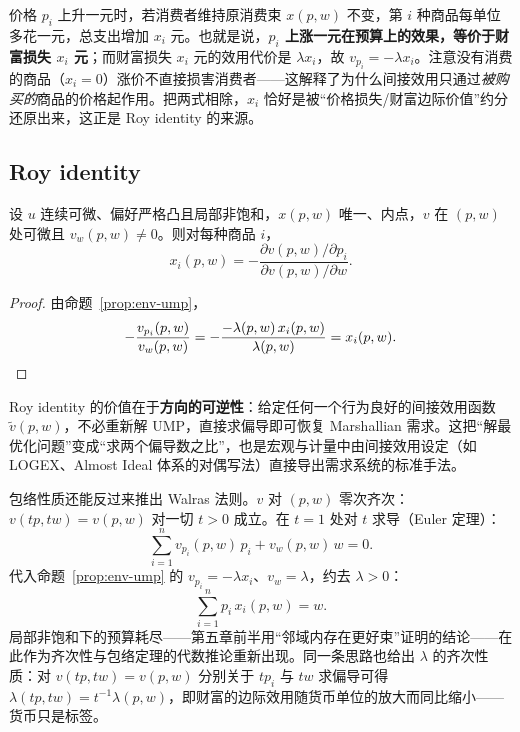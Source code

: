 \begin{remark}[涨价等于变穷：$\partial v/\partial p_i=-\lambda x_i$]
价格 $p_i$ 上升一元时，若消费者维持原消费束 $x(p,w)$ 不变，第 $i$ 种商品每单位多花一元，总支出增加 $x_i$ 元。也就是说，\textbf{$p_i$ 上涨一元在预算上的效果，等价于财富损失 $x_i$ 元}；而财富损失 $x_i$ 元的效用代价是 $\lambda x_i$，故 $v_{p_i}=-\lambda x_i$。注意没有消费的商品（$x_i=0$）涨价不直接损害消费者——这解释了为什么间接效用只通过\emph{被购买的}商品的价格起作用。把两式相除，$x_i$ 恰好是被“价格损失/财富边际价值”约分还原出来，这正是 Roy identity 的来源。
\end{remark}

\subsection{Roy identity}

\begin{theorem}\label{thm:roy}
设 $u$ 连续可微、偏好严格凸且局部非饱和，$x(p,w)$ 唯一、内点，$v$ 在 $(p,w)$ 处可微且 $v_w(p,w)\neq0$。则对每种商品 $i$，
\[
 \boxed{\;x_i(p,w)=-\frac{\partial v(p,w)/\partial p_i}{\partial v(p,w)/\partial w}.\;}
\]
\end{theorem}

\begin{proof}
由命题~\ref{prop:env-ump}，
\[
 -\frac{v_{p_i}(p,w)}{v_w(p,w)}
 =-\frac{-\lambda(p,w)\,x_i(p,w)}{\lambda(p,w)}=x_i(p,w).\qedhere
\]
\end{proof}

Roy identity 的价值在于\textbf{方向的可逆性}：给定任何一个行为良好的间接效用函数 $\tilde v(p,w)$，不必重新解 UMP，直接求偏导即可恢复 Marshallian 需求。这把“解最优化问题”变成“求两个偏导数之比”，也是宏观与计量中由间接效用设定（如 LOGEX、Almost Ideal 体系的对偶写法）直接导出需求系统的标准手法。

\begin{remark}[用包络定理重证预算耗尽]
包络性质还能反过来推出 Walras 法则。$v$ 对 $(p,w)$ 零次齐次：$v(tp,tw)=v(p,w)$ 对一切 $t>0$ 成立。在 $t=1$ 处对 $t$ 求导（Euler 定理）：
\[
 \sum_{i=1}^{n}v_{p_i}(p,w)\,p_i+v_w(p,w)\,w=0 .
\]
代入命题~\ref{prop:env-ump} 的 $v_{p_i}=-\lambda x_i$、$v_w=\lambda$，约去 $\lambda>0$：
\[
 \sum_{i=1}^{n}p_i\,x_i(p,w)=w .
\]
局部非饱和下的预算耗尽——第五章前半用“邻域内存在更好束”证明的结论——在此作为齐次性与包络定理的代数推论重新出现。同一条思路也给出 $\lambda$ 的齐次性质：对 $v(tp,tw)=v(p,w)$ 分别关于 $tp_i$ 与 $tw$ 求偏导可得 $\lambda(tp,tw)=t^{-1}\lambda(p,w)$，即财富的边际效用随货币单位的放大而同比缩小——货币只是标签。
\end{remark}

